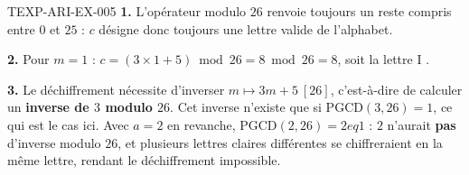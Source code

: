 \begin{corrige}{TEXP-ARI-EX-005}
\textbf{1.} L'opérateur \og modulo $26$ \fg{} renvoie toujours un reste compris entre $0$ et $25$ : $c$ désigne donc toujours une lettre valide de l'alphabet.

\textbf{2.} Pour $m=1$ : $c=(3\times1+5)\bmod26 = 8\bmod26 = 8$, soit la lettre \og I \fg{}.

\textbf{3.} Le déchiffrement nécessite d'inverser $m\mapsto3m+5\ [26]$, c'est-à-dire de calculer un \textbf{inverse de $3$ modulo $26$}. Cet inverse n'existe que si $\mathrm{PGCD}(3,26)=1$, ce qui est le cas ici. Avec $a=2$ en revanche, $\mathrm{PGCD}(2,26)=2
eq1$ : $2$ n'aurait \textbf{pas} d'inverse modulo $26$, et plusieurs lettres claires différentes se chiffreraient en la même lettre, rendant le déchiffrement impossible.
\end{corrige}
